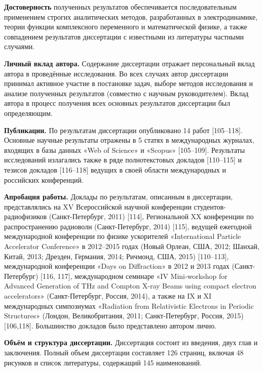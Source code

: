\textbf{Достоверность} полученных результатов обеспечивается последовательным применением строгих аналитических методов, разработанных в электродинамике, теории функции комплексного переменного и математической физике, а также совпадением результатов диссертации с известными из литературы частными случаями.

\textbf{Личный вклад автора.} Содержание диссертации отражает персональный вклад автора в проведённые исследования. Во всех случаях автор диссертации принимал активное участие в постановке задач, выборе методов исследования и анализе полученных результатов (совместно с научным руководителем). Вклад автора в процесс получения всех основных результатов диссертации был определяющим.

\textbf{Публикации.} По результатам диссертации опубликовано 14 работ [105–118]. Основные научные результаты отражены в 5 статях в международных журналах, входящих в базы данных «Web of Science» и «Scopus» [105–109]. Результаты исследований излагались также в ряде полнотекстовых докладов [110–115] и тезисов докладов [116–118] ведущих в своей области международных и российских конференций.

\textbf{Апробация работы.} Доклады по результатам, описанным в диссертации, представлялись на XV Всероссийской научной конференции студентов-радиофизиков (Санкт-Петербург, 2011) [114], Региональной XX конференции по распространению радиоволн (Санкт-Петербург, 2014) [115], ведущей ежегодной международной конференции по физике ускорителей «International Particle Accelerator Conference» в 2012–2015 годах (Новый Орлеан, США, 2012; Шанхай, Китай, 2013; Дрезден, Германия, 2014; Ричмонд, США, 2015) [110–113], международной конференции «Days on Diffraction» в 2012 и 2013 годах (Санкт-Петербург) [116, 117], международном семинаре «IV Mini-workshop for Advanced Generation of THz and Compton X-ray Beams using compact electron accelerators» (Санкт-Петербург, Россия, 2014), а также на IX и XI международных симпозиумах «Radiation from Relativistic Electrons in Periodic Structures» (Лондон, Великобритания, 2011; Санкт-Петербург, Россия, 2015) [106,118]. Большинство докладов было представлено автором лично.

\textbf{Объём и структура диссертации.} Диссертация состоит из введения, двух глав и заключения. Полный объем диссертации составляет 126 страниц, включая 48 рисунков и список литературы, содержащий 145 наименований.

